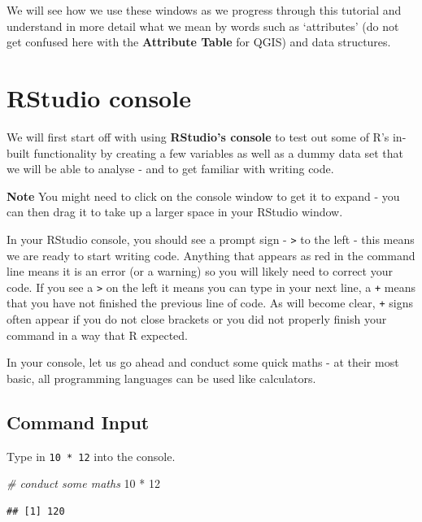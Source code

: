\documentclass[
]{book}
\newenvironment{Shaded}{\begin{snugshade}}{\end{snugshade}}
\newcommand{\CommentTok}[1]{\textcolor[rgb]{0.56,0.35,0.01}{\textit{#1}}}
\newcommand{\DecValTok}[1]{\textcolor[rgb]{0.00,0.00,0.81}{#1}}
\newcommand{\SpecialCharTok}[1]{\textcolor[rgb]{0.00,0.00,0.00}{#1}}
\begin{document}
We will see how we use these windows as we progress through this tutorial and understand in more detail what we mean by words such as `attributes' (do not get confused here with the \textbf{Attribute Table} for QGIS) and data structures.

\hypertarget{rstudio-console}{%
\section{RStudio console}\label{rstudio-console}}

We will first start off with using \textbf{RStudio's console} to test out some of R's in-built functionality by creating a few variables as well as a dummy data set that we will be able to analyse - and to get familiar with writing code.

\textbf{Note}
You might need to click on the console window to get it to expand - you can then drag it to take up a larger space in your RStudio window.

In your RStudio console, you should see a prompt sign - \texttt{\textgreater{}} to the left - this means we are ready to start writing code. Anything that appears as red in the command line means it is an error (or a warning) so you will likely need to correct your code. If you see a \texttt{\textgreater{}} on the left it means you can type in your next line, a \texttt{+} means that you have not finished the previous line of code. As will become clear, \texttt{+} signs often appear if you do not close brackets or you did not properly finish your command in a way that R expected.

In your console, let us go ahead and conduct some quick maths - at their most basic, all programming languages can be used like calculators.

\hypertarget{command-input}{%
\subsection{Command Input}\label{command-input}}

Type in \texttt{10\ *\ 12} into the console.

\begin{Shaded}
\begin{Highlighting}[]
\CommentTok{\# conduct some maths}
\DecValTok{10} \SpecialCharTok{*} \DecValTok{12}
\end{Highlighting}
\end{Shaded}

\begin{verbatim}
## [1] 120
\end{verbatim}
\end{document}
